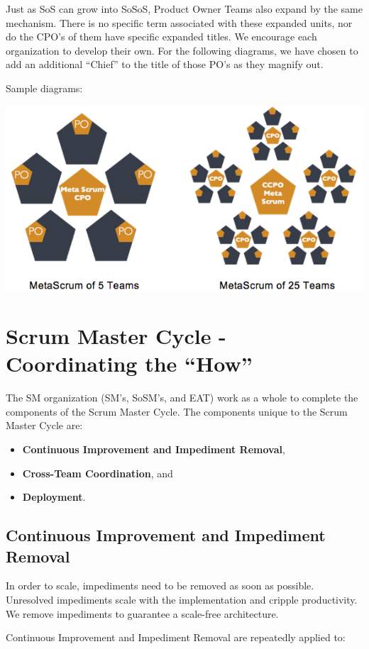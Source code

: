 \documentclass[12pt,a4paper,parskip=full]{scrartcl}
\begin{document}
Just as SoS can grow into SoSoS, Product Owner Teams also expand by the same mechanism. There is no specific term associated with these expanded units, nor do the CPO's of them have specific expanded titles. We encourage each organization to develop their own. For the following diagrams, we have chosen to add an additional ``Chief'' to the title of those PO's as they magnify out.

Sample diagrams:

\includegraphics[width=1.0\linewidth]{MetaScrum-R2.png}

\section{Scrum Master Cycle - Coordinating the ``How''}

The SM organization (SM's, SoSM's, and EAT) work as a whole to complete the components of the Scrum Master Cycle. The components unique to the Scrum Master Cycle are: 
\begin{itemize}
	\item \textbf{Continuous Improvement and Impediment Removal},
	\item \textbf{Cross-Team Coordination}, and
	\item \textbf{Deployment}.
\end{itemize}

\subsection{Continuous Improvement and Impediment Removal}

In order to scale, impediments need to be removed as soon as possible.
Unresolved impediments scale with the implementation and cripple productivity.
We remove impediments to guarantee a scale-free architecture.

Continuous Improvement and Impediment Removal are repeatedly applied to:
\end{document}
